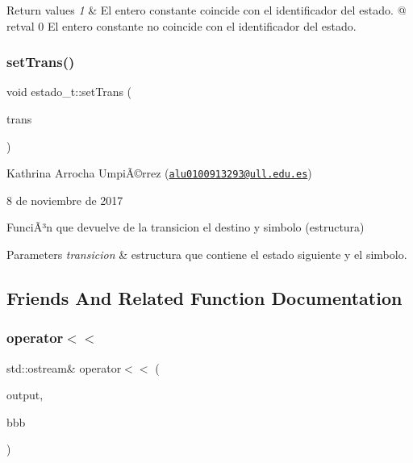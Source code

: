 \begin{DoxyRetVals}{Return values}
{\em 1} & El entero constante coincide con el identificador del estado. @ retval 0 El entero constante no coincide con el identificador del estado. \\
\hline
\end{DoxyRetVals}
\mbox{\label{classestado__t_a3e1a732c3eeb1d678e70bbefd3243a39}} 
\subsubsection{\texorpdfstring{set\+Trans()}{setTrans()}}
{\footnotesize\ttfamily void estado\+\_\+t\+::set\+Trans (\begin{DoxyParamCaption}\item[{\hyperlink{structtransicion}{transicion} $\ast$}]{trans }\end{DoxyParamCaption})}

Kathrina Arrocha UmpiÃ©rrez (\href{mailto:alu0100913293@ull.edu.es}{\tt alu0100913293@ull.\+edu.\+es})

8 de noviembre de 2017

FunciÃ³n que devuelve de la transicion el destino y simbolo (estructura) 
\begin{DoxyParams}{Parameters}
{\em transicion} & estructura que contiene el estado siguiente y el simbolo. \\
\hline
\end{DoxyParams}


\subsection{Friends And Related Function Documentation}
\mbox{\label{classestado__t_abd9a0348d2219634dee1ab5c9d3a2083}} 
\subsubsection{\texorpdfstring{operator$<$$<$}{operator<<}}
{\footnotesize\ttfamily std\+::ostream\& operator$<$$<$ (\begin{DoxyParamCaption}\item[{std\+::ostream \&}]{output,  }\item[{const \hyperlink{classestado__t}{estado\+\_\+t} \&}]{bbb }\end{DoxyParamCaption})\hspace{0.3cm}{\ttfamily [friend]}}

